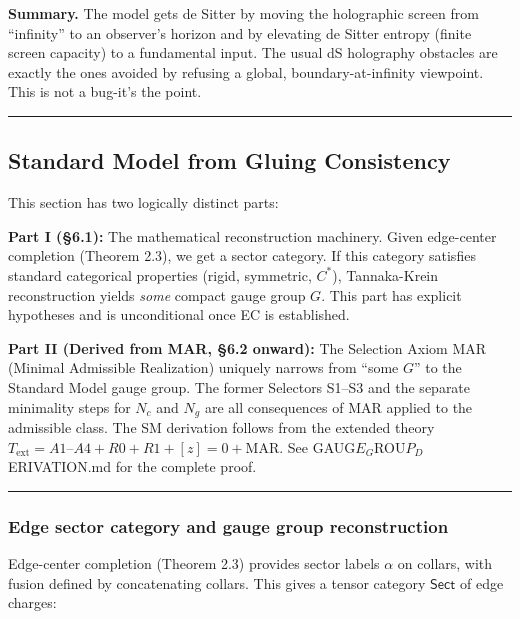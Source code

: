 \documentclass[11pt,a4paper]{article}
\theoremstyle{remark}
\begin{document}
\textbf{Summary.} The model gets de Sitter by moving the holographic screen from
``infinity'' to an observer's horizon and by elevating de Sitter entropy
(finite screen capacity) to a fundamental input. The usual dS holography
obstacles are exactly the ones avoided by refusing a global,
boundary-at-infinity viewpoint. This is not a bug-it's the point.

\begin{center}\rule{0.5\linewidth}{0.5pt}\end{center}

\subsection{Standard Model from Gluing Consistency}\label{standard-model-from-gluing-consistency}

This section has two logically distinct parts:

\textbf{Part I (§6.1):} The mathematical reconstruction machinery. Given
edge-center completion (Theorem 2.3), we get a sector category. If this
category satisfies standard categorical properties (rigid, symmetric, \(C^*\)),
Tannaka-Krein reconstruction yields \emph{some} compact gauge group \(G\). This part
has explicit hypotheses and is unconditional once EC is established.

\textbf{Part II (Derived from MAR, §6.2 onward):} The Selection Axiom MAR
(Minimal Admissible Realization) uniquely narrows from ``some \(G\)'' to the
Standard Model gauge group. The former Selectors S1--S3 and the separate
minimality steps for \(N_c\) and \(N_g\) are all consequences of MAR applied to
the admissible class. The SM derivation follows from the extended theory
\(T_{\mathrm{ext}} = A1\text{--}A4 + R0 + R1 + [z]=0 + \mathrm{MAR}\).
See GAUG$E_G$ROU$P_D$ERIVATION.md for the complete proof.

\begin{center}\rule{0.5\linewidth}{0.5pt}\end{center}

\subsubsection{Edge sector category and gauge group reconstruction}\label{edge-sector-category-and-gauge-group-reconstruction}

Edge-center completion (Theorem 2.3) provides sector labels \(\alpha\) on collars,
with fusion defined by concatenating collars. This gives a tensor category
\(\mathsf{Sect}\) of edge charges:
\end{document}

